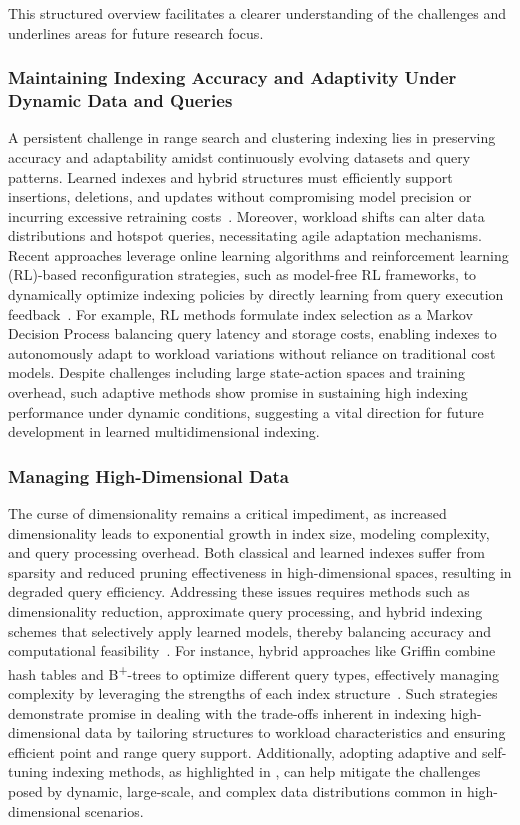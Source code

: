 \documentclass[sigconf]{acmart}
\begin{document}
This structured overview facilitates a clearer understanding of the challenges and underlines areas for future research focus.

\subsubsection{Maintaining Indexing Accuracy and Adaptivity Under Dynamic Data and Queries}

A persistent challenge in range search and clustering indexing lies in preserving accuracy and adaptability amidst continuously evolving datasets and query patterns. Learned indexes and hybrid structures must efficiently support insertions, deletions, and updates without compromising model precision or incurring excessive retraining costs~\cite{ref34}. Moreover, workload shifts can alter data distributions and hotspot queries, necessitating agile adaptation mechanisms. Recent approaches leverage online learning algorithms and reinforcement learning (RL)-based reconfiguration strategies, such as model-free RL frameworks, to dynamically optimize indexing policies by directly learning from query execution feedback~\cite{ref33}. For example, RL methods formulate index selection as a Markov Decision Process balancing query latency and storage costs, enabling indexes to autonomously adapt to workload variations without reliance on traditional cost models. Despite challenges including large state-action spaces and training overhead, such adaptive methods show promise in sustaining high indexing performance under dynamic conditions, suggesting a vital direction for future development in learned multidimensional indexing.

\subsubsection{Managing High-Dimensional Data}

The curse of dimensionality remains a critical impediment, as increased dimensionality leads to exponential growth in index size, modeling complexity, and query processing overhead. Both classical and learned indexes suffer from sparsity and reduced pruning effectiveness in high-dimensional spaces, resulting in degraded query efficiency. Addressing these issues requires methods such as dimensionality reduction, approximate query processing, and hybrid indexing schemes that selectively apply learned models, thereby balancing accuracy and computational feasibility~\cite{ref31,ref35}. For instance, hybrid approaches like Griffin combine hash tables and B\textsuperscript{+}-trees to optimize different query types, effectively managing complexity by leveraging the strengths of each index structure~\cite{ref35}. Such strategies demonstrate promise in dealing with the trade-offs inherent in indexing high-dimensional data by tailoring structures to workload characteristics and ensuring efficient point and range query support. Additionally, adopting adaptive and self-tuning indexing methods, as highlighted in \cite{ref31}, can help mitigate the challenges posed by dynamic, large-scale, and complex data distributions common in high-dimensional scenarios.
\end{document}
